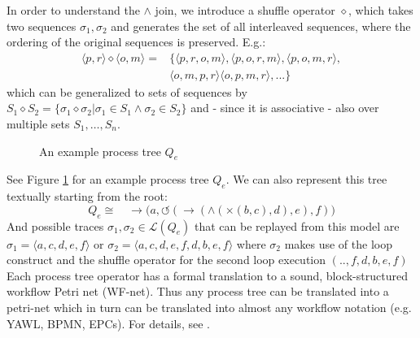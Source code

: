 \documentclass[a4paper]{IEEEtran}
\begin{document}
In order to understand the $\wedge$ join, we introduce a shuffle operator $\diamond$, which takes two sequences $\sigma_1, \sigma_2$ and generates the set of all interleaved sequences, where the ordering of the original sequences is preserved. E.g.: 
\begin{align*}
\langle p,r\rangle \diamond \langle o,m \rangle = &\{ \langle p,r,o,m \rangle, \langle p,o,r,m \rangle, \langle p,o,m,r \rangle, \\ 
& \langle o,m,p,r \rangle \langle o,p,m,r\rangle, ... \} 
\end{align*}
which can be generalized to sets of sequences by $S_1 \diamond S_2 = \{ \sigma_1 \diamond \sigma_2 | \sigma_1 \in S_1 \wedge \sigma_2 \in S_2 \}$ and - since it is associative - also over multiple sets $S_1, \dots, S_n$.

\begin{figure}[h!]
    \centering
    \usetikzlibrary{graphdrawing.trees}
\caption{An example process tree $Q_e$}
\label{fig:tree}
\end{figure}

See Figure \ref{fig:tree} for an example process tree $Q_e$. We can also represent this tree textually starting from the root:
\begin{equation}
    Q_e \cong \quad \rightarrow\big(a, \circlearrowleft(\rightarrow(\wedge(\times(b,c),d),e),f)\big) 
\end{equation}
And possible traces $\sigma_1, \sigma_2 \in \mathcal{L}(Q_e)$ that can be replayed from this model are $\sigma_1 = \langle a, c, d, e, f\rangle $ or $\sigma_2 = \langle a, c, d, e, f, d, b, e, f\rangle$ where $\sigma_2$ makes use of the loop construct and the shuffle operator for the second loop execution $(.., f, d, b, e, f)$
Each process tree operator has a formal translation to a sound, block-structured workflow Petri net (WF-net). Thus any process tree can be translated into a petri-net which in turn can be translated into almost any workflow notation (e.g. YAWL, BPMN, EPCs). For details, see \cite{buijs2012treetranslation}.
\end{document}
